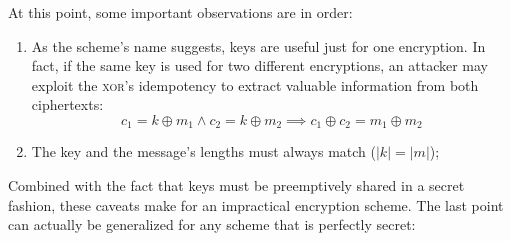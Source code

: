 At this point, some important observations are in order:
\begin{enumerate}
    \item As the scheme's name suggests, keys are useful just for one encryption. In fact, if the same key is used for two different encryptions, an attacker may exploit the \textsc{xor}'s idempotency to extract valuable information from both ciphertexts:
    \[
        c_1 = k \oplus m_1 \wedge c_2 = k \oplus m_2 \implies c_1 \oplus c_2 = m_1 \oplus m_2
    \]
    \item The key and the message's lengths must always match ($|k| = |m|$);

    
\end{enumerate}

Combined with the fact that keys must be preemptively shared in a secret fashion, these caveats make for an impractical encryption scheme. The last point can actually be generalized for any scheme that is perfectly secret:

